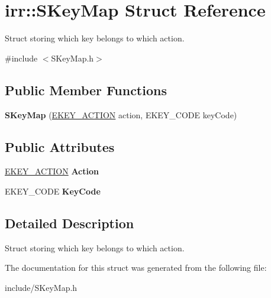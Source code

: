 \hypertarget{structirr_1_1SKeyMap}{}\section{irr\+:\+:S\+Key\+Map Struct Reference}
\label{structirr_1_1SKeyMap}


Struct storing which key belongs to which action.  




{\ttfamily \#include $<$S\+Key\+Map.\+h$>$}

\subsection*{Public Member Functions}
\begin{DoxyCompactItemize}
\item 
{\bfseries S\+Key\+Map} (\hyperlink{namespaceirr_aa9946ac9f3142f9e790ce52d59fd6168}{E\+K\+E\+Y\+\_\+\+A\+C\+T\+I\+ON} action, E\+K\+E\+Y\+\_\+\+C\+O\+DE key\+Code)\hypertarget{structirr_1_1SKeyMap_a4b3644184da8474be1452ba8680e4dee}{}\label{structirr_1_1SKeyMap_a4b3644184da8474be1452ba8680e4dee}

\end{DoxyCompactItemize}
\subsection*{Public Attributes}
\begin{DoxyCompactItemize}
\item 
\hyperlink{namespaceirr_aa9946ac9f3142f9e790ce52d59fd6168}{E\+K\+E\+Y\+\_\+\+A\+C\+T\+I\+ON} {\bfseries Action}\hypertarget{structirr_1_1SKeyMap_a704d8b6d5d7625ff0e3430e3526888aa}{}\label{structirr_1_1SKeyMap_a704d8b6d5d7625ff0e3430e3526888aa}

\item 
E\+K\+E\+Y\+\_\+\+C\+O\+DE {\bfseries Key\+Code}\hypertarget{structirr_1_1SKeyMap_a7242b0afa53acc48fe4d54c58f128fb2}{}\label{structirr_1_1SKeyMap_a7242b0afa53acc48fe4d54c58f128fb2}

\end{DoxyCompactItemize}


\subsection{Detailed Description}
Struct storing which key belongs to which action. 

The documentation for this struct was generated from the following file\+:\begin{DoxyCompactItemize}
\item 
include/S\+Key\+Map.\+h\end{DoxyCompactItemize}
